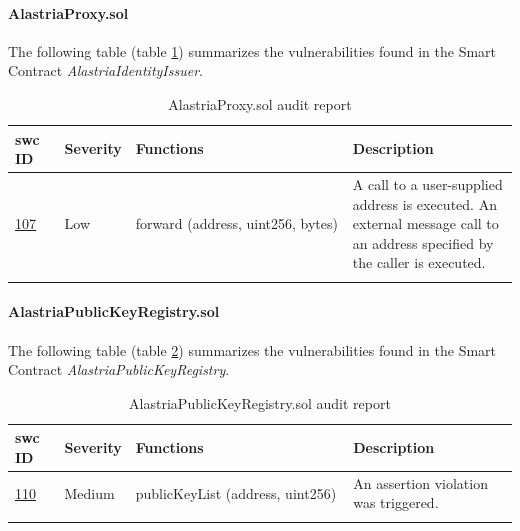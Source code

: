 \documentclass[a4paper, 12pt]{article} %
\begin{document}
            \paragraph{AlastriaProxy.sol}
                The following table (table \ref{tab:AlastriaProxy}) summarizes the vulnerabilities found in the Smart Contract \textit{AlastriaIdentityIssuer}.
                \begin{longtable}{||p{0.1\linewidth} | p{0.11\linewidth} | p{0.45\linewidth} | p{0.35\linewidth}||}
                    \hline
                    \textbf{\acrshort{swc} ID} & \textbf{Severity} & \textbf{Functions} & \textbf{Description} \\ [0.5ex] 
                    \hline\hline
                    \href{https://swcregistry.io/docs/SWC-107}{107} & Low & forward (address, uint256, bytes) & A call to a user-supplied address is executed. An external message call to an address specified by the caller is executed.\\ [1ex] 
                    \hline
                    \caption{AlastriaProxy.sol audit report}
                    \label{tab:AlastriaProxy}
                \end{longtable}
                
            \paragraph{AlastriaPublicKeyRegistry.sol}
                The following table (table \ref{tab:AlastriaPublicKeyRegistry}) summarizes the vulnerabilities found in the Smart Contract \textit{AlastriaPublicKeyRegistry}.
                \begin{longtable}{||p{0.1\linewidth} | p{0.11\linewidth} | p{0.45\linewidth} | p{0.35\linewidth}||}
                    \hline
                    \textbf{\acrshort{swc} ID} & \textbf{Severity} & \textbf{Functions} & \textbf{Description} \\ [0.5ex] 
                    \hline\hline
                    \href{https://swcregistry.io/docs/SWC-110}{110} & Medium & publicKeyList (address, uint256) & An assertion violation was triggered.\\ [1ex] 
                    \hline
                    \caption{AlastriaPublicKeyRegistry.sol audit report}
                    \label{tab:AlastriaPublicKeyRegistry}
                \end{longtable}
        
\end{document}

